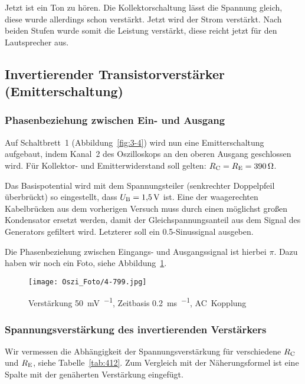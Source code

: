 Jetzt ist ein Ton zu hören. Die Kollektorschaltung lässt die Spannung gleich,
diese wurde allerdings schon verstärkt. Jetzt wird der Strom verstärkt. Nach
beiden Stufen wurde somit die Leistung verstärkt, diese reicht jetzt für den
Lautsprecher aus.

\FloatBarrier
\subsection{Invertierender Transistorverstärker (Emitterschaltung)}

\FloatBarrier
\subsubsection{Phasenbeziehung zwischen Ein- und Ausgang}

Auf Schaltbrett~1 (Abbildung~\ref{fig:3-4}) wird nun eine Emitterschaltung
aufgebaut, indem Kanal~2 des Oszilloskops an den oberen Ausgang geschlossen
wird. Für Kollektor- und Emitterwiderstand soll gelten: $R_\text{C} = R_\text{E} =
\SI{390}{\ohm}$.

Das Basispotential wird mit dem Spannungsteiler (senkrechter Doppelpfeil
überbrückt) so eingestellt, dass $U_\text{B} = \SI{1.5}{\volt}$ ist. Eine der
waagerechten Kabelbrücken aus dem vorherigen Versuch muss durch einen möglichst
großen Kondensator ersetzt werden, damit der Gleichspannungsanteil aus dem
Signal des Generators gefiltert wird. Letzterer soll ein
\SI{0.5}{\voltss}-Sinussignal ausgeben.

Die Phasenbeziehung zwischen Eingangs- und Ausgangssignal ist hierbei $\pi$.
Dazu haben wir noch ein Foto, siehe Abbildung~\ref{fig:799}.

\begin{figure}[htbp]
	\centering
	\texttt{[image: Oszi\_Foto/4-799.jpg]}
	\caption{%
		Verstärkung \SI{50}{\milli\volt\per\division},
		Zeitbasis \SI{.2}{\milli\second\per\division},
		AC~Kopplung
	}
	\label{fig:799}
\end{figure}

\FloatBarrier
\subsubsection{Spannungsverstärkung des invertierenden Verstärkers}

Wir vermessen die Abhängigkeit der Spannungsverstärkung für verschiedene $R_\text{C}$
und $R_\text{E}$, siehe Tabelle~\ref{tab:412}. Zum Vergleich mit der Näherungsformel
ist eine Spalte mit der genäherten Verstärkung eingefügt.

